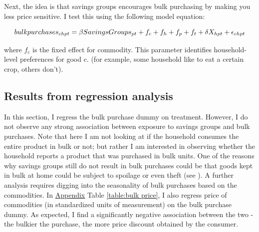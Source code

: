 \documentclass[12pt]{article}
\begin{document}
{\hspace{1cm} Next, the idea is that savings groups encourages bulk purchasing by making you less price sensitive. I test this using the following model equation:

\boldmath
\begin{equation}
bulk purchases_{chpt} = \beta SavingsGroups_{pt}\\
+ f_c  + f_h + f_p + f_t   + \delta X_{hpt} + \epsilon_{chpt}\\
\end{equation}
\unboldmath

where $f_c$ is the fixed effect for commodity. This parameter identifies household-level preferences for good c. (for example, some household like to eat a certain crop, others don’t). 



\subsection{Results from regression analysis}\label{sec:regression2}

\hspace{1cm} In this section, I regress the bulk purchase dummy on treatment. However, I do not observe any strong association between exposure to savings groups and bulk purchases. Note that here I am not looking at if the household consumes the entire product in bulk or not; but rather I am interested in observing whether the household reports a product that was purchased in bulk units. One of the reasons why savings groups still do not result in bulk purchases could be that goods kept in bulk at home could be subject to spoilage or even theft (see \cite{aggarwal}). A further analysis requires digging into the seasonality of bulk purchases based on the commodities. In \hyperref[sec:appendix]{Appendix} Table \ref{table:bulk price}, I also regress price of commodities (in standardized units of measurement) on the bulk purchase dummy. As expected, I find a significantly negative association between the two - the bulkier the purchase, the more price discount obtained by the consumer.

}
\end{document}
